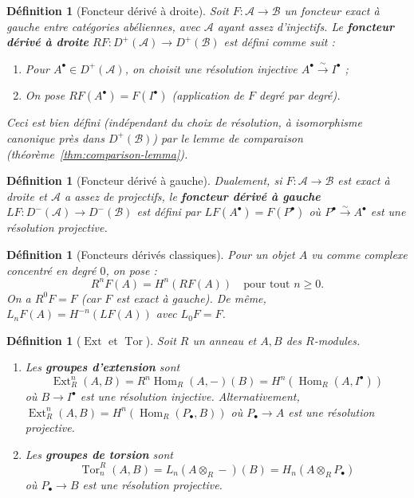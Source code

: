 \documentclass[a4paper,12pt]{book}
\DeclareMathOperator{\Hom}{Hom}
\newtheorem{definition}[theoreme]{Définition}
\begin{document}
\begin{definition}[Foncteur dérivé à droite]\label{def:right-derived}
Soit $F \colon \mathcal{A} \to \mathcal{B}$ un foncteur exact à gauche
entre catégories abéliennes, avec $\mathcal{A}$ ayant assez d'injectifs.
Le \textbf{foncteur dérivé à droite} $RF \colon D^+(\mathcal{A}) \to D^+(\mathcal{B})$
est défini comme suit :
\begin{enumerate}[label=\arabic*.]
\item Pour $A^\bullet \in D^+(\mathcal{A})$, on choisit une résolution
  injective $A^\bullet \xrightarrow{\sim} I^\bullet$ ;
\item On pose $RF(A^\bullet) = F(I^\bullet)$
  (application de $F$ degré par degré).
\end{enumerate}
Ceci est bien défini (indépendant du choix de résolution, à isomorphisme
canonique près dans $D^+(\mathcal{B})$) par le lemme de comparaison
(théorème~\ref{thm:comparison-lemma}).
\end{definition}

\begin{definition}[Foncteur dérivé à gauche]\label{def:left-derived}
Dualement, si $F \colon \mathcal{A} \to \mathcal{B}$ est exact à droite
et $\mathcal{A}$ a assez de projectifs, le \textbf{foncteur dérivé à gauche}
$LF \colon D^-(\mathcal{A}) \to D^-(\mathcal{B})$ est défini par
$LF(A^\bullet) = F(P^\bullet)$ où $P^\bullet \xrightarrow{\sim} A^\bullet$
est une résolution projective.
\end{definition}

\begin{definition}[Foncteurs dérivés classiques]\label{def:classical-derived}
Pour un objet $A$ vu comme complexe concentré en degré $0$, on pose :
\[
  R^n F(A) = H^n(RF(A)) \quad \text{pour tout } n \geq 0.
\]
On a $R^0 F = F$ (car $F$ est exact à gauche). De même,
$L_n F(A) = H^{-n}(LF(A))$ avec $L_0 F = F$.
\end{definition}

\begin{definition}[$\operatorname{Ext}$ et $\operatorname{Tor}$]%
\label{def:ext-tor}
Soit $R$ un anneau et $A, B$ des $R$-modules.
\begin{enumerate}[label=(\roman*)]
\item Les \textbf{groupes d'extension} sont
\[
  \operatorname{Ext}_R^n(A, B) = R^n \Hom_R(A, -)(B)
  = H^n(\Hom_R(A, I^\bullet))
\]
où $B \to I^\bullet$ est une résolution injective.
Alternativement,
$\operatorname{Ext}_R^n(A, B) = H^n(\Hom_R(P_\bullet, B))$
où $P_\bullet \to A$ est une résolution projective.

\item Les \textbf{groupes de torsion} sont
\[
  \operatorname{Tor}_n^R(A, B) = L_n(A \otimes_R -)(B)
  = H_n(A \otimes_R P_\bullet)
\]
où $P_\bullet \to B$ est une résolution projective.
\end{enumerate}
\end{definition}
\end{document}

